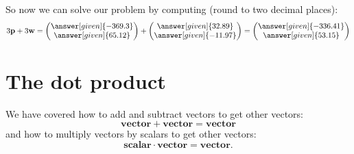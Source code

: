 \documentclass{ximera}
\begin{document}
\begin{example}[Navigation]
\begin{explanation}
\begin{enumerate}
\begin{center}
  \end{center}
  So now we can solve our problem by computing (round to two decimal places):
  \[
  3\vec{p} + 3 \vec{w} = \begin{pmatrix} \answer[given]{-369.3}\\ \answer[given]{65.12} \end{pmatrix} + \begin{pmatrix} \answer[given]{32.89} \\
  \answer[given]{-11.97} \end{pmatrix} = \begin{pmatrix} \answer[given]{-336.41} \\ \answer[given]{53.15}\end{pmatrix}
  \]
\end{enumerate}
\end{explanation}
\end{example}







\section{The dot product}


We have covered how to add and subtract vectors to get other vectors:
\[
\mathbf{vector} +\mathbf{vector} = \mathbf{vector}
\]
and how to multiply vectors by scalars to get other vectors:
\[
\mathbf{scalar}\cdot \mathbf{vector} = \mathbf{vector}.
\]
\end{document}
